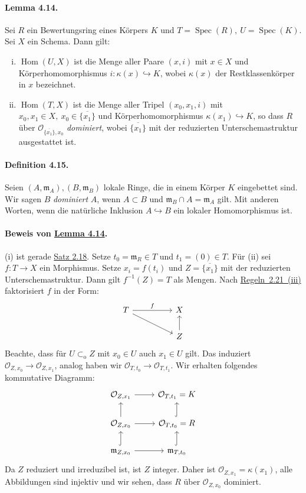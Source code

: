 \paragraph{Lemma 4.14.}\label{4.14} Sei $R$ ein Bewertungsring eines Körpers $K$ und $T=\operatorname{Spec}(R),\ U=\operatorname{Spec}(K)$. Sei $X$ ein Schema. Dann gilt:
\begin{enumerate}[(i)]
\item $\operatorname{Hom}(U,X)$ ist die Menge aller Paare $(x,i)$ mit $x\in X$ und Körperhomomorphismus $i:\kappa(x)\hookrightarrow K$, wobei $\kappa(x)$ der Restklassenkörper in $x$ bezeichnet.
\item $\operatorname{Hom}(T,X)$ ist die Menge aller Tripel $(x_0,x_1,i)$ mit $x_0,x_1\in X,\ x_0\in\overline{\{x_1\}}$ und Körperhomomorphismus $\kappa(x_1)\hookrightarrow K$, so dass $R$ über $\mathcal{O}_{\overline{\{x_1\}},x_0}$ \textit{dominiert}, wobei $\overline{\{x_1\}}$ mit der reduzierten Unterschemastruktur ausgestattet ist.
\end{enumerate}

\paragraph{Definition 4.15.}\label{4.15} Seien $(A,\mathfrak{m}_A),(B,\mathfrak{m}_B)$ lokale Ringe, die in einem Körper $K$ eingebettet sind. Wir sagen $B$ \textit{dominiert} $A$, wenn $A\subset B$ und $\mathfrak{m}_B\cap A=\mathfrak{m}_A$ gilt. Mit anderen Worten, wenn die natürliche Inklusion $A\hookrightarrow B$ ein lokaler Homomorphismus ist.

\paragraph{Beweis von \hyperref[4.14]{Lemma 4.14}.} (i) ist gerade \hyperref[2.18]{Satz 2.18}. Setze $t_0=\mathfrak{m}_R\in T$ und $t_1=(0)\in T$. Für (ii) sei $f:T\to X$ ein Morphismus. Setze $x_i=f(t_i)$ und $Z=\overline{\{x_1\}}$ mit der reduzierten Unterschemastruktur. Dann gilt $f^{-1}(Z)=T$ als Mengen. Nach \hyperref[2.21]{Regeln~2.21~(iii)} faktorisiert $f$ in der Form:
\[\begin{tikzcd}
T\ar[rr, "f"]\ar[rrd] &&X\\
&& Z\ar[u]
\end{tikzcd} \]
Beachte, dass für $U\subset_\text{o} Z$ mit $x_0\in U$ auch $x_1\in U$ gilt. Das induziert $\mathcal{O}_{Z,x_0}\to\mathcal{O}_{Z,x_1}$, analog haben wir $\mathcal{O}_{T,t_0}\to\mathcal{O}_{T,t_1}$. Wir erhalten folgendes kommutative Diagramm:
\[\begin{tikzcd}
\mathcal{O}_{Z,x_1} \ar[r]& \mathcal{O}_{T,t_1}=K\\
\mathcal{O}_{Z,x_0} \ar[r]\ar[u]& \mathcal{O}_{T,t_0}=R\ar[u, hook]\\
\mathfrak{m}_{Z,x_0}\ar[r]\ar[u, hook] & \mathfrak{m}_{T,t_0}\ar[u, hook]
\end{tikzcd}\]
Da $Z$ reduziert und irreduzibel ist, ist $Z$ integer. Daher ist $\mathcal{O}_{Z,x_1}=\kappa(x_1)$, alle Abbildungen sind injektiv und wir sehen, dass $R$ über $\mathcal{O}_{Z,x_0}$ dominiert.

